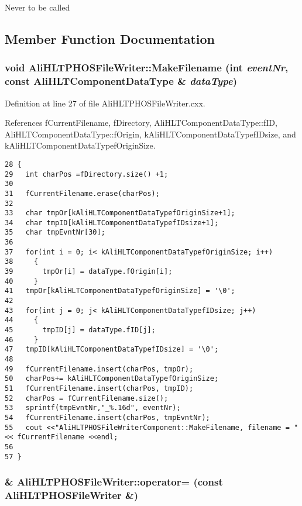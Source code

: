 Never to be called 

\subsection{Member Function Documentation}
\subsubsection{\setlength{\rightskip}{0pt plus 5cm}void Ali\-HLTPHOSFile\-Writer::Make\-Filename (int {\em event\-Nr}, const {\bf Ali\-HLTComponent\-Data\-Type} \& {\em data\-Type})}\label{classAliHLTPHOSFileWriter_a2}




Definition at line 27 of file Ali\-HLTPHOSFile\-Writer.cxx.

References f\-Current\-Filename, f\-Directory, Ali\-HLTComponent\-Data\-Type::f\-ID, Ali\-HLTComponent\-Data\-Type::f\-Origin, k\-Ali\-HLTComponent\-Data\-Typef\-IDsize, and k\-Ali\-HLTComponent\-Data\-Typef\-Origin\-Size.

\footnotesize\begin{verbatim}28 {
29   int charPos =fDirectory.size() +1;
30 
31   fCurrentFilename.erase(charPos);
32 
33   char tmpOr[kAliHLTComponentDataTypefOriginSize+1];
34   char tmpID[kAliHLTComponentDataTypefIDsize+1];
35   char tmpEvntNr[30];
36 
37   for(int i = 0; i< kAliHLTComponentDataTypefOriginSize; i++)
38     {
39       tmpOr[i] = dataType.fOrigin[i]; 
40     }
41   tmpOr[kAliHLTComponentDataTypefOriginSize] = '\0';
42 
43   for(int j = 0; j< kAliHLTComponentDataTypefIDsize; j++)
44     {
45       tmpID[j] = dataType.fID[j]; 
46     }
47   tmpID[kAliHLTComponentDataTypefIDsize] = '\0';
48 
49   fCurrentFilename.insert(charPos, tmpOr);
50   charPos+= kAliHLTComponentDataTypefOriginSize;
51   fCurrentFilename.insert(charPos, tmpID);
52   charPos = fCurrentFilename.size();
53   sprintf(tmpEvntNr,"_%.16d", eventNr);
54   fCurrentFilename.insert(charPos, tmpEvntNr);
55   cout <<"AliHLTPHOSFileWriterComponent::MakeFilename, filename = " << fCurrentFilename <<endl;
56   
57 }
\end{verbatim}\normalsize 


\subsubsection{\& Ali\-HLTPHOSFile\-Writer::operator= (const {\bf Ali\-HLTPHOSFile\-Writer} \&)\hspace{0.3cm}{\tt  [inline, private]}}\label{classAliHLTPHOSFileWriter_d1}




